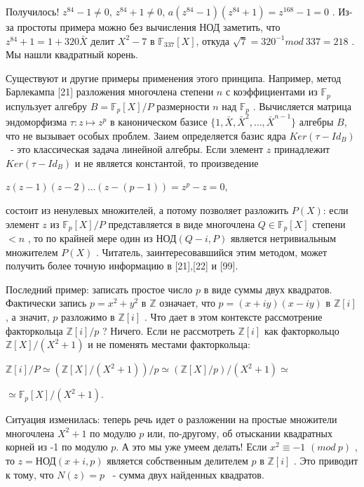 \documentclass{mai_book}
\begin{document}
Получилось! $z^{84}-1\not= 0$, $z^{84}+1\not= 0$, $a(z^{84}-1)(z^{84}+1)=z^{168}-1=0$
. Из-за простоты примера можно без вычисления НОД заметить, что $z^{84}+1=1+320\bar X$
 делит $X^2-7$
 в $\mathbb{F}_{337}[X]$, откуда $\sqrt 7 = 320^{-1} mod \ 337 = 218$
. Мы нашли квадратный корень.

Существуют и другие примеры применения этого принципа. Например, метод Барлекампа [21] разложения многочлена степени $n$
 с коэффициентами из $\mathbb{F}_p$
 испульзует алгебру $B=\mathbb{F}_p[X]/P$
 размерности $n$
 над $\mathbb{F}_p$
 . Вычисляется матрица эндоморфизма $\tau: z\mapsto z^p$
 в каноническом базисе $\{1,\bar X,\bar X^2,\ldots,\bar X^{n-1}\}$
 алгебры $B$, что не вызывает особых проблем. Заием определяется базис ядра $Ker(\tau-Id_B)$ 
 ~- это классическая задача линейной алгебры. Если элемент $z$
 принадлежит $Ker(\tau-Id_B)$
 и не является константой, то произведение

\begin{center}
$z(z-1)(z-2)\ldots(z-(p-1))=z^p-z=0$,
\end{center}


состоит из ненулевых множителей, а потому позволяет разложить $P(X)$:
если элемент $z$
 из  $\mathbb{F}_p[X]/P$
 представляется в виде многочлена $Q\in\mathbb{F}_p[X]$
 степени $<n$
 , то по крайней мере один из НОД$(Q-i,P)$
 является нетривиальным множителем $P(X)$
 . Читатель, заинтересовавшийся этим методом, может получить более точную информацию в [21],[22] и [99].

Последний пример: записать простое число $p$  в виде суммы двух квадратов. Фактически запись $p=x^2+y^2$
 в  $\mathbb{Z}$
 означает, что $p=(x+iy)(x-iy)$
 в  $\mathbb{Z}[i]$
 , а значит, $p$ разложимо в  $\mathbb{Z}[i]$
. Что дает в этом контексте рассмотрение факторкольца $\mathbb{Z}[i]/p$
? Ничего. Если не рассмотреть  $\mathbb{Z}[i]$
 как факторкольцо  $\mathbb{Z}[X]/(X^2+1)$
 и не поменять местами факторкольца:

\begin{center}
$\mathbb{Z}[i]/P\simeq(\mathbb{Z}[X]/(X^2+1))/p\simeq(\mathbb{Z}[X]/p)/(X^2+1)\simeq$

$\simeq \mathbb{F}_p[X]/(X^2+1)$.
\end{center}


Ситуация изменилась: теперь речь идет о разложении на простые множители многочлена $X^2+1$
 по модулю $p$ или, по-другому, об отыскании квадратных корней из -1 по модулю $p$. А это мы уже умеем делать! Если $x^2\equiv -1$ $(mod \ p)$
 , то $z =$НОД$(x+i,p)$
 является собственным делителем $p$
 в $\mathbb{Z}[i]$
 . Это приводит к тому, что $N(z)=p$
 ~- сумма двух найденных квадратов.
\end{document}
